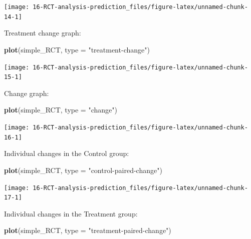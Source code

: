 \documentclass[
]{book}
\newenvironment{Shaded}{\begin{snugshade}}{\end{snugshade}}
\newcommand{\DataTypeTok}[1]{\textcolor[rgb]{0.13,0.29,0.53}{#1}}
\newcommand{\KeywordTok}[1]{\textcolor[rgb]{0.13,0.29,0.53}{\textbf{#1}}}
\newcommand{\NormalTok}[1]{#1}
\newcommand{\StringTok}[1]{\textcolor[rgb]{0.31,0.60,0.02}{#1}}
\begin{document}
\begin{center}\texttt{[image: 16-RCT-analysis-prediction\_files/figure-latex/unnamed-chunk-14-1]} \end{center}

Treatment change graph:

\begin{Shaded}
\begin{Highlighting}[]
\KeywordTok{plot}\NormalTok{(simple\_RCT, }\DataTypeTok{type =} \StringTok{"treatment{-}change"}\NormalTok{)}
\end{Highlighting}
\end{Shaded}

\begin{center}\texttt{[image: 16-RCT-analysis-prediction\_files/figure-latex/unnamed-chunk-15-1]} \end{center}

Change graph:

\begin{Shaded}
\begin{Highlighting}[]
\KeywordTok{plot}\NormalTok{(simple\_RCT, }\DataTypeTok{type =} \StringTok{"change"}\NormalTok{)}
\end{Highlighting}
\end{Shaded}

\begin{center}\texttt{[image: 16-RCT-analysis-prediction\_files/figure-latex/unnamed-chunk-16-1]} \end{center}

Individual changes in the Control group:

\begin{Shaded}
\begin{Highlighting}[]
\KeywordTok{plot}\NormalTok{(simple\_RCT, }\DataTypeTok{type =} \StringTok{"control{-}paired{-}change"}\NormalTok{)}
\end{Highlighting}
\end{Shaded}

\begin{center}\texttt{[image: 16-RCT-analysis-prediction\_files/figure-latex/unnamed-chunk-17-1]} \end{center}

Individual changes in the Treatment group:

\begin{Shaded}
\begin{Highlighting}[]
\KeywordTok{plot}\NormalTok{(simple\_RCT, }\DataTypeTok{type =} \StringTok{"treatment{-}paired{-}change"}\NormalTok{)}
\end{Highlighting}
\end{Shaded}
\end{document}
